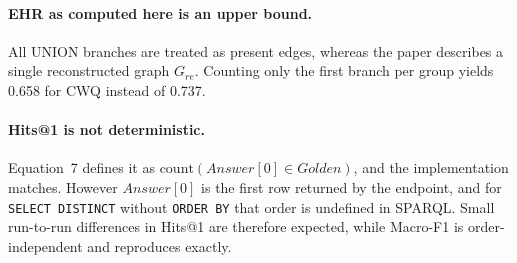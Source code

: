 \documentclass[11pt,a4paper]{article}
\begin{document}
\paragraph{EHR as computed here is an upper bound.}
All UNION branches are treated as present edges, whereas the paper describes a
single reconstructed graph \(G_{re}\). Counting only the first branch per group
yields \num{0.658} for CWQ instead of \num{0.737}.

\paragraph{Hits@1 is not deterministic.}
Equation~7 defines it as \(\text{count}(\textit{Answer}[0] \in
\textit{Golden})\), and the implementation matches. However
\(\textit{Answer}[0]\) is the first row returned by the endpoint, and for
\texttt{SELECT DISTINCT} without \texttt{ORDER BY} that order is undefined in
SPARQL. Small run-to-run differences in Hits@1 are therefore expected, while
Macro-F1 is order-independent and reproduces exactly.
\end{document}
